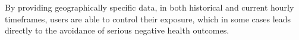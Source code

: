 By providing geographically specific data, in both historical and current hourly timeframes, users are able
to control their exposure, which in some cases leads directly to the avoidance of serious negative health outcomes.\\
\begin{comment}
\begin{figure}[ht]
    \centering 
    \begin{tikzpicture}[thick]
        \node[draw,rectangle,minimum size=20] (a) {Location Permission};
        \node[draw,circle,minimum size=6,right of= a, node distance=4cm] (b) {Change position};
        \node[draw,circle,minimum size=5,right of= b, node distance=4cm] (c) {Minimum poll time};
        \node[draw,rectangle,minimum size=20,below of=c, node distance=2cm] (d) {Save polygon and pollution measurements};
        \draw[->] (a) to (b);
        \draw[->] (b) to (b);
        \draw[->,green] (b) to (c);
        \draw[->] (c) to (d);
        \draw[->] (c) to (b);
    \end{tikzpicture}
    \caption{Collecting user location}
\end{figure}

\begin{figure}[ht]
    \centering
    \texttt{[image: importedDataDecember]}
    \caption{Personal Records. December}
\end{figure}
\end{comment}